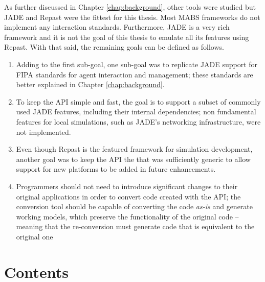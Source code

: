 As further discussed in Chapter \ref{chap:background}, other tools were studied but JADE and Repast were the fittest for this thesis. Most MABS frameworks do not implement any interaction standards. Furthermore, JADE is a very rich framework and it is not the goal of this thesis to emulate all its features using Repast. With that said, the remaining goals can be defined as follows.

\begin{enumerate}
	\item Adding to the first sub-goal, one sub-goal was to replicate JADE support for FIPA standards for agent interaction and management; these standards are better explained in Chapter \ref{chap:background}.
	\item To keep the API simple and fast, the goal is to support a subset of commonly used JADE features, including their internal dependencies; non fundamental features for local simulations, such as JADE's networking infrastructure, were not implemented.
	\item Even though Repast is the featured framework for simulation development, another goal was to keep the API the that was sufficiently generic to allow support for new platforms to be added in future enhancements.
	\item Programmers should not need to introduce significant changes to their original applications in order to convert code created with the API; the conversion tool should be capable of converting the code \emph{as-is} and generate working models, which preserve the functionality of the original code -- meaning that the re-conversion must generate code that is equivalent to the original one
\end{enumerate}



\section{Contents}


